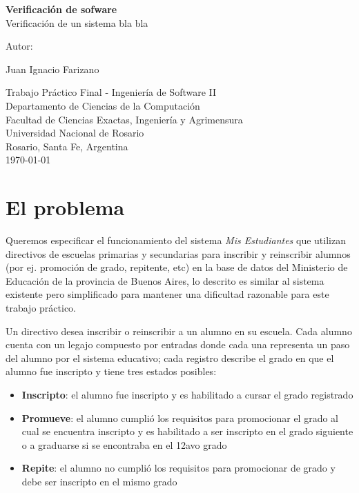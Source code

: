 \documentclass{article}
\begin{document}
\begin{titlepage}
  \thispagestyle{empty}
  \begin{center}
    
    {\huge \textbf{Verificación de sofware} \\[0.4cm]}
    {\large Verificación de un sistema bla bla} \\
    \noindent
    
    \vfill
    \vfill
    \vfill
    {\Large Autor: \par}
    {\Large Juan Ignacio Farizano\par}
  
    \vfill
    Trabajo Práctico Final - Ingeniería de Software II \\
    Departamento de Ciencias de la Computaci\'on\\
    Facultad de Ciencias Exactas, Ingenier\'ia y Agrimensura\\
    Universidad Nacional de Rosario \\
    Rosario, Santa Fe, Argentina\\[0.4cm]
    {\large \today} 
  \end{center}
  \end{titlepage}

\section*{El problema}
Queremos especificar el funcionamiento del sistema \emph{Mis Estudiantes} que utilizan directivos de escuelas primarias y secundarias para inscribir y reinscribir alumnos (por ej. promoción de grado, repitente, etc) en la base de datos del Ministerio de Educación de la provincia de Buenos Aires, lo descrito es similar al sistema existente pero simplificado para mantener una dificultad razonable para este trabajo práctico.


Un directivo desea inscribir o reinscribir a un alumno en su escuela. Cada alumno cuenta con un legajo compuesto por entradas donde cada una representa un paso del alumno por el sistema educativo; cada registro describe el grado en que el alumno fue inscripto y tiene tres estados posibles:

\begin{itemize}
  \item \textbf{Inscripto}: el alumno fue inscripto y es habilitado a cursar el grado registrado
  \item \textbf{Promueve}: el alumno cumplió los requisitos para promocionar el grado al cual se encuentra inscripto y es habilitado a ser inscripto en el grado siguiente o a graduarse si se encontraba en el 12avo grado
  \item \textbf{Repite}: el alumno no cumplió los requisitos para promocionar de grado y debe ser inscripto en el mismo grado
\end{itemize}
\end{document}
